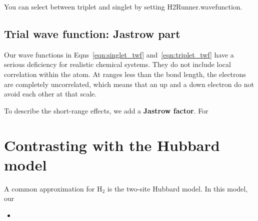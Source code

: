 \documentclass[12pt]{article}
\begin{document}
You can select between triplet and singlet by setting H2Runner.wavefunction.

\subsection*{Trial wave function: Jastrow part}

Our wave functions in Eqns~\ref{eqn:singlet_twf} and~\ref{eqn:triplet_twf} have a serious deficiency for realistic chemical systems. 
They do not include local correlation within the atom. 
At ranges less than the bond length, the electrons are completely uncorrelated, which means that an up and a down electron do not avoid each other at that scale.

To describe the short-range effects, we add a {\bf Jastrow factor}.
For 

\section*{Contrasting with the Hubbard model}

A common approximation for H$_2$ is the two-site Hubbard model. 
In this model, our 

\begin{itemize}
\item 	
\end{itemize}
\end{document}
